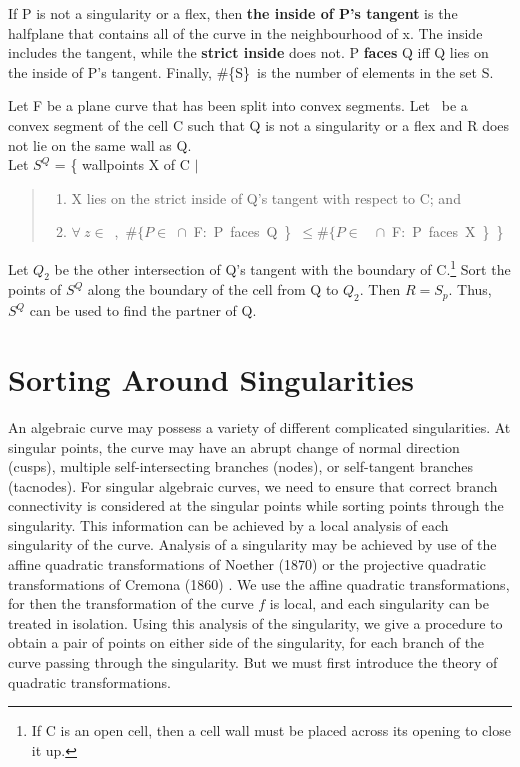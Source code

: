 \begin{definition}
If P is not a singularity or a flex, 
then {\bf the inside of P's tangent} is the halfplane that contains 
all of the curve in the neighbourhood of x.
The inside includes the tangent, while the {\bf strict inside} does not.
P {\bf faces} Q iff Q lies on the inside of P's tangent.  
Finally, \#\{S\}\ is the number of elements in the set S.
\end{definition}

\begin{theorem}
\label{thm-assocwpts}
Let F be a plane curve that has been split into convex segments.
Let \ be a convex segment of the cell C such that 
Q is not a singularity or a flex and R does not lie on the same wall as Q.\\
Let $S^{Q}$ = \{ wallpoints X of C $\mid$
\begin{quote}
\begin{enumerate}
\item X lies on the strict inside of Q's tangent with respect to C; and
\item \mbox{$\forall\ z \in $ , $\#\{P \in$ 
$\cap$ F: P faces Q \} $\leq \#\{P \in $ \ $\cap$ F: P faces X \}  \}}
\end{enumerate}
\end{quote}
Let $Q_{2}$ be the other intersection of Q's 
tangent with the boundary of C.\footnote{If 
C is an open cell, then a cell wall must be placed across its opening to close it up.}
Sort the points of $S^{Q}$ along the boundary of the cell
from Q to $Q_{2}$.
Then $R = S_{p}$.
Thus, $S^{Q}$ can be used to find the partner of Q.
\end{theorem}
%
\section{Sorting Around Singularities}
\label{ambiguity}

\tab An algebraic curve may possess a variety of different complicated singularities.
At singular points, the curve may have an abrupt change of normal direction (cusps),
multiple self-intersecting branches (nodes), or self-tangent branches (tacnodes).
For singular algebraic curves, we need to ensure that 
correct branch connectivity is considered at the singular points while sorting
points through the singularity.
This information can be achieved by a local analysis of each singularity of the curve. Analysis
of a singularity may be achieved by use of
the affine quadratic transformations of Noether (1870) or the projective
quadratic transformations of Cremona (1860) \cite{wa}.
We use the affine quadratic transformations,
for then the transformation of the curve $f$ is local, and 
each singularity can be treated in isolation.
Using this analysis of the singularity, we give a procedure to obtain a pair
of points on either side of the singularity, for each branch of the curve passing through the singularity.
But we must first introduce the theory of quadratic transformations.

